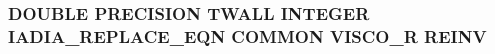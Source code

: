 \hypertarget{visco_8com_a572d2eabf094e0bf11921a66d45a36b2}{
\subsubsection[{R\-E\-I\-N\-V}]{\setlength{\rightskip}{0pt plus 5cm}D\-O\-U\-B\-L\-E P\-R\-E\-C\-I\-S\-I\-O\-N T\-W\-A\-L\-L I\-N\-T\-E\-G\-E\-R I\-A\-D\-I\-A\-\_\-\-R\-E\-P\-L\-A\-C\-E\-\_\-\-E\-Q\-N C\-O\-M\-M\-O\-N V\-I\-S\-C\-O\-\_\-\-R R\-E\-I\-N\-V}}\label{visco_8com_a572d2eabf094e0bf11921a66d45a36b2}
